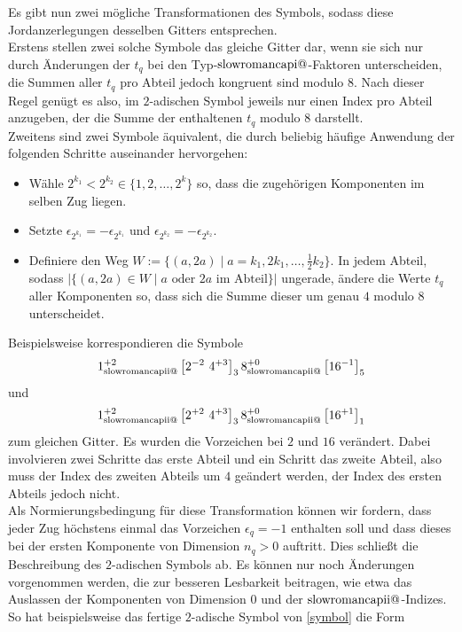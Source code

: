 \documentclass[12pt,a4paper,halfparskip,headsepline,bibtotocnumbered]{scrreprt}
\makeatletter
\theoremstyle{nummermitklammern}
\theoremstyle{nonumberbreak}
\renewcommand{\i}{\text{\expandafter\@slowromancap\romannumeral 1@}}
\newcommand{\ii}{\text{\expandafter\@slowromancap\romannumeral 2@}}
\makeatother
\begin{document}
Es gibt nun zwei mögliche Transformationen des Symbols, sodass diese Jordanzerlegungen desselben Gitters entsprechen.\\
Erstens stellen zwei solche Symbole das gleiche Gitter dar, wenn sie sich nur durch Änderungen der $t_q$ bei den Typ-$\i$-Faktoren unterscheiden, die Summen aller $t_q$ pro Abteil jedoch kongruent sind modulo $8$. Nach dieser Regel genügt es also, im $2$-adischen Symbol jeweils nur einen Index pro Abteil anzugeben, der die Summe der enthaltenen $t_q$ modulo $8$ darstellt.\\
Zweitens sind zwei Symbole äquivalent, die durch beliebig häufige Anwendung der folgenden Schritte auseinander hervorgehen:
\begin{itemize}
	\item Wähle $2^{k_1} < 2^{k_2} \in \lbrace 1, 2, \dots, 2^k \rbrace$ so, dass die zugehörigen Komponenten im selben Zug liegen.
	\item Setzte $\epsilon_{2^{k_1}} = - \epsilon_{2^{k_1}}$ und $\epsilon_{2^{k_2}} = - \epsilon_{2^{k_2}}$.
	\item Definiere den Weg $W := \lbrace (a,2a) \mid a = k_1, 2 k_1, \dots, \frac{1}{2}k_2 \rbrace$. In jedem Abteil, sodass $\vert \lbrace (a, 2a) \in W \mid a \text{ oder } 2a \text{ im Abteil} \rbrace \vert$ ungerade, ändere die Werte $t_q$ aller Komponenten so, dass sich die Summe dieser um genau $4$ modulo $8$ unterscheidet.
\end{itemize}
Beispielsweise korrespondieren die Symbole
\begin{equation*}
	1_{\ii}^{+2} \left[ 2^{-2}\ 4^{+3} \right]_3 8_{\ii}^{+0} \left[ 16^{-1} \right]_5
\end{equation*}
und
\begin{equation*}
	1_{\ii}^{+2} \left[ 2^{+2}\ 4^{+3} \right]_3 8_{\ii}^{+0} \left[ 16^{+1} \right]_1
\end{equation*}
zum gleichen Gitter. Es wurden die Vorzeichen bei $2$ und $16$ verändert. Dabei involvieren zwei Schritte das erste Abteil und ein Schritt das zweite Abteil, also muss der Index des zweiten Abteils um $4$ geändert werden, der Index des ersten Abteils jedoch nicht.\\
Als Normierungsbedingung für diese Transformation können wir fordern, dass jeder Zug höchstens einmal das Vorzeichen $\epsilon_q = -1$ enthalten soll und dass dieses bei der ersten Komponente von Dimension $n_q > 0$ auftritt. Dies schließt die Beschreibung des $2$-adischen Symbols ab. Es können nur noch Änderungen vorgenommen werden, die zur besseren Lesbarkeit beitragen, wie etwa das Auslassen der Komponenten von Dimension $0$ und der $\ii$-Indizes. So hat beispielsweise das fertige $2$-adische Symbol von \eqref{symbol} die Form
\end{document}
